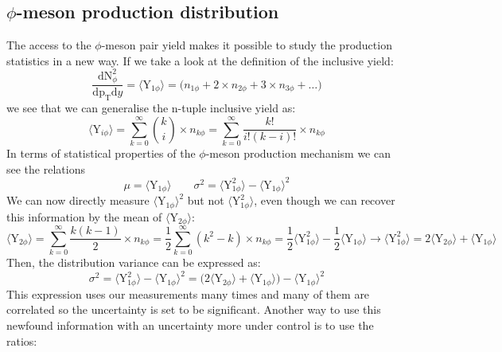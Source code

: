 \subsection{$\phi$-meson production distribution}
The access to the $\phi$-meson pair yield makes it possible to study the production statistics in a new way. If we take a look at the definition of the inclusive yield:
\begin{equation}
\frac{\text{dN}^2_{\phi}}{\text{dp}_{\text{T}}\text{d}y} = \langle \text{Y}_{1\phi} \rangle = \Big( n_{1\phi} + 2\times n_{2\phi} + 3\times n_{3\phi} + \dots \Big)
\label{eq:}
\end{equation}
we see that we can generalise the n-tuple inclusive yield as:
\begin{equation}
\langle \text{Y}_{i\phi} \rangle = \sum_{k=0}^{\infty} \binom{k}{i}\times n_{k\phi} = \sum_{k=0}^{\infty} \frac{k!}{i!(k-i)!} \times n_{k\phi} 
\label{eq:}
\end{equation}
In terms of statistical properties of the $\phi$-meson production mechanism we can see the relations
\begin{equation}
\mu = \langle \text{Y}_{1\phi} \rangle \qquad \sigma^2 = \langle \text{Y}_{1\phi}^2 \rangle -  \langle \text{Y}_{1\phi} \rangle^2
\label{eq:}
\end{equation}
We can now directly measure $\langle \text{Y}_{1\phi} \rangle^2$ but not $\langle \text{Y}_{1\phi}^2 \rangle$, even though we can recover this information by the mean of $\langle \text{Y}_{2\phi} \rangle$:
\begin{equation}
\langle \text{Y}_{2\phi} \rangle = \sum_{k=0}^{\infty} \frac{k(k-1)}{2} \times n_{k\phi} = \frac{1}{2} \sum_{k=0}^{\infty} (k^2-k) \times n_{k\phi} = \frac{1}{2}\langle \text{Y}^2_{1\phi} \rangle - \frac{1}{2}\langle \text{Y}_{1\phi} \rangle \to \langle \text{Y}^2_{1\phi} \rangle = 2\langle \text{Y}_{2\phi} \rangle + \langle \text{Y}_{1\phi} \rangle
\label{eq:}
\end{equation}
Then, the distribution variance can be expressed as:
\begin{equation}
\sigma^2 = \langle \text{Y}_{1\phi}^2 \rangle -  \langle \text{Y}_{1\phi} \rangle^2 = \Big(  2\langle \text{Y}_{2\phi} \rangle + \langle \text{Y}_{1\phi} \rangle \Big) - \langle \text{Y}_{1\phi} \rangle^2
\label{eq:}
\end{equation}
This expression uses our measurements many times and many of them are correlated so the uncertainty is set to be significant. Another way to use this newfound information with an uncertainty more under control is to use the ratios:

